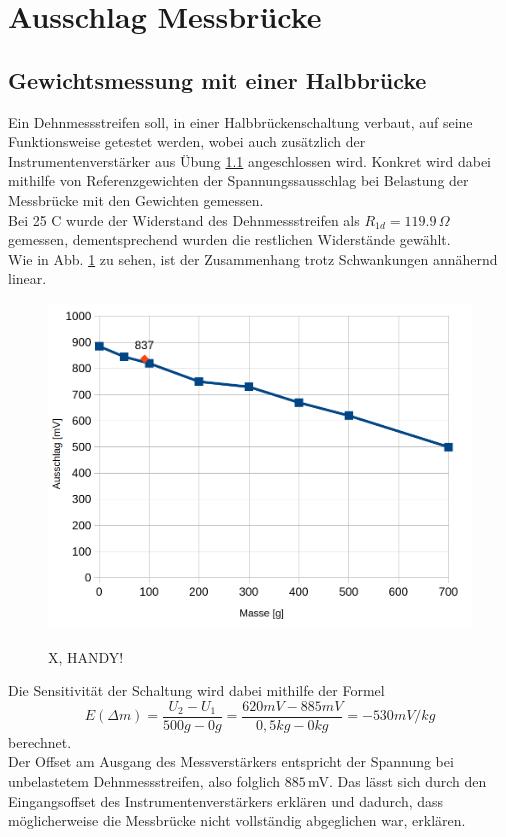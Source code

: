 \section{Ausschlag Messbrücke}
\subsection{Gewichtsmessung mit einer Halbbrücke}
Ein Dehnmessstreifen soll, in einer Halbbrückenschaltung verbaut, auf seine Funktionsweise getestet werden, wobei auch zusätzlich der Instrumentenverstärker aus Übung \ref{} angeschlossen wird. Konkret wird dabei mithilfe von Referenzgewichten der Spannungssausschlag bei Belastung der Messbrücke mit den Gewichten gemessen. \\
Bei 25 C wurde der Widerstand des Dehnmessstreifen als $R_{1d}=119.9\,\Omega$ gemessen, dementsprechend wurden die restlichen Widerstände gewählt.\\
Wie in Abb. \ref{fig:gewicht_mb} zu sehen, ist der Zusammenhang trotz Schwankungen annähernd linear. 
\begin{figure}[H]
	\includegraphics[width=\textwidth]{./img/ch3/GewichtsmessungHalbbruecke_3_3_1.png}
	\label{fig:gewicht_mb}
	\caption{X, HANDY!}
\end{figure}
Die Sensitivität der Schaltung wird dabei mithilfe der Formel
\begin{equation}
	 E(\Delta m) = \frac{U_2-U_1}{500g-0g}=\frac{620mV-885mV}{0,5kg-0kg}=-530mV/kg
\end{equation}
berechnet. \\
Der Offset am Ausgang des Messverstärkers entspricht der Spannung bei unbelastetem Dehnmessstreifen, also folglich $885\,$mV. Das lässt sich durch den Eingangsoffset des Instrumentenverstärkers erklären und dadurch, dass möglicherweise die Messbrücke nicht vollständig abgeglichen war, erklären. \\
